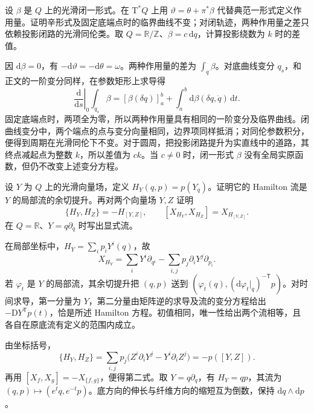 \begin{exercise}\label{g4:ex:0901:closed-primitive-change}
	设 \(\beta\) 是 \(Q\) 上的光滑闭一形式。在 \(\mathrm{T}^*Q\) 上用 \(\vartheta=\theta+\pi^*\beta\) 代替典范一形式定义作用量。证明辛形式及固定底端点时的临界曲线不变；对闭轨迹，两种作用量之差只依赖投影闭路的光滑同伦类。取 \(Q=\mathbb R/\mathbb Z\)、\(\beta=c\,\mathrm{d}q\)，计算投影绕数为 \(k\) 时的差值。
\end{exercise}
\begin{solution}
	因 \(\mathrm{d}\beta=0\)，有 \(-\mathrm{d}\vartheta=-\mathrm{d}\theta=\omega\)。两种作用量的差为 \(\int_q\beta\)。对底曲线变分 \(q_s\)，和正文的一阶变分同样，在参数矩形上求导得
	\[
		\left.\frac{\mathrm{d}}{\mathrm{d}s}\right|_0\int_{q_s}\beta
		=[\beta(\delta q)]_a^b
		+\int_a^b\mathrm{d}\beta(\delta q,\dot q)\,\mathrm{d}t.
	\]
	固定底端点时，两项全为零，所以两种作用量具有相同的一阶变分及临界曲线。闭曲线变分中，两个端点的点与变分向量相同，边界项同样抵消；对同伦参数积分，便得到周期在光滑同伦下不变。对于圆周，把投影闭路提升为实直线中的道路，其终点减起点为整数 \(k\)，所以差值为 \(c k\)。当 \(c\ne0\) 时，闭一形式 \(\beta\) 没有全局实原函数，但仍不改变上述变分方程。
\end{solution}

\begin{exercise}\label{g4:ex:0902:cotangent-lift-generator}
	设 \(Y\) 为 \(Q\) 上的光滑向量场，定义 \(H_Y(q,p)=p(Y_q)\)。证明它的 Hamilton 流是 \(Y\) 的局部流的余切提升。再对两个向量场 \(Y,Z\) 证明
	\[
		\{H_Y,H_Z\}=-H_{[Y,Z]},\qquad
		[X_{H_Y},X_{H_Z}]=X_{H_{[Y,Z]}}.
	\]
	在 \(Q=\mathbb R\)、\(Y=q\partial_q\) 时写出显式流。
\end{exercise}
\begin{solution}
	在局部坐标中，\(H_Y=\sum_i p_iY^i(q)\)，故
	\[
		X_{H_Y}=\sum_iY^i\partial_{q^i}
		-\sum_{i,j}p_j\partial_iY^j\partial_{p_i}.
	\]
	若 \(\varphi_t\) 是 \(Y\) 的局部流，其余切提升把 \((q,p)\) 送到 \((\varphi_t(q),(\mathrm{d}\varphi_t|_q)^{-\mathsf T}p)\)。对时间求导，第一分量为 \(Y\)，第二分量由矩阵逆的求导及流的变分方程给出 \(-\mathrm{D}Y^{\mathsf T}p(t)\)，恰是所述 Hamilton 方程。初值相同，唯一性给出两个流相等，且各自在原底流有定义的范围内成立。

	由坐标括号，
	\[
		\{H_Y,H_Z\}
		=\sum_{i,j}p_j\bigl(Z^i\partial_iY^j-Y^i\partial_iZ^j\bigr)
		=-p([Y,Z]).
	\]
	再用 \([X_f,X_g]=-X_{\{f,g\}}\)，便得第二式。取 \(Y=q\partial_q\)，有 \(H_Y=qp\)，其流为 \((q,p)\mapsto(e^tq,e^{-t}p)\)。底方向的伸长与纤维方向的缩短互为倒数，保持 \(\mathrm{d}q\wedge\mathrm{d}p\)。
\end{solution}

